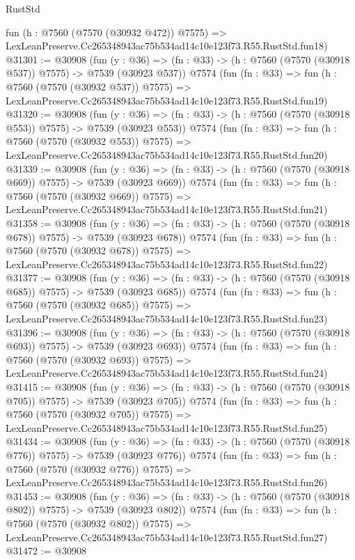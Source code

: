 \begin{lexlean}{RustStd}
\begin{coremodule}
    fun (h : @7560 (@7570 (@30932 @472)) @7575) =>
    LexLeanPreserve.Cc265348943ac75b534ad14c10e123f73.R55.RustStd.fun18)
@31301 := @30908
    (fun (y : @36) => (fn : @33) -> (h : @7560 (@7570 (@30918 @537)) @7575) -> @7539 (@30923 @537))
    @7574
    (fun (fn : @33) =>
    fun (h : @7560 (@7570 (@30932 @537)) @7575) =>
    LexLeanPreserve.Cc265348943ac75b534ad14c10e123f73.R55.RustStd.fun19)
@31320 := @30908
    (fun (y : @36) => (fn : @33) -> (h : @7560 (@7570 (@30918 @553)) @7575) -> @7539 (@30923 @553))
    @7574
    (fun (fn : @33) =>
    fun (h : @7560 (@7570 (@30932 @553)) @7575) =>
    LexLeanPreserve.Cc265348943ac75b534ad14c10e123f73.R55.RustStd.fun20)
@31339 := @30908
    (fun (y : @36) => (fn : @33) -> (h : @7560 (@7570 (@30918 @669)) @7575) -> @7539 (@30923 @669))
    @7574
    (fun (fn : @33) =>
    fun (h : @7560 (@7570 (@30932 @669)) @7575) =>
    LexLeanPreserve.Cc265348943ac75b534ad14c10e123f73.R55.RustStd.fun21)
@31358 := @30908
    (fun (y : @36) => (fn : @33) -> (h : @7560 (@7570 (@30918 @678)) @7575) -> @7539 (@30923 @678))
    @7574
    (fun (fn : @33) =>
    fun (h : @7560 (@7570 (@30932 @678)) @7575) =>
    LexLeanPreserve.Cc265348943ac75b534ad14c10e123f73.R55.RustStd.fun22)
@31377 := @30908
    (fun (y : @36) => (fn : @33) -> (h : @7560 (@7570 (@30918 @685)) @7575) -> @7539 (@30923 @685))
    @7574
    (fun (fn : @33) =>
    fun (h : @7560 (@7570 (@30932 @685)) @7575) =>
    LexLeanPreserve.Cc265348943ac75b534ad14c10e123f73.R55.RustStd.fun23)
@31396 := @30908
    (fun (y : @36) => (fn : @33) -> (h : @7560 (@7570 (@30918 @693)) @7575) -> @7539 (@30923 @693))
    @7574
    (fun (fn : @33) =>
    fun (h : @7560 (@7570 (@30932 @693)) @7575) =>
    LexLeanPreserve.Cc265348943ac75b534ad14c10e123f73.R55.RustStd.fun24)
@31415 := @30908
    (fun (y : @36) => (fn : @33) -> (h : @7560 (@7570 (@30918 @705)) @7575) -> @7539 (@30923 @705))
    @7574
    (fun (fn : @33) =>
    fun (h : @7560 (@7570 (@30932 @705)) @7575) =>
    LexLeanPreserve.Cc265348943ac75b534ad14c10e123f73.R55.RustStd.fun25)
@31434 := @30908
    (fun (y : @36) => (fn : @33) -> (h : @7560 (@7570 (@30918 @776)) @7575) -> @7539 (@30923 @776))
    @7574
    (fun (fn : @33) =>
    fun (h : @7560 (@7570 (@30932 @776)) @7575) =>
    LexLeanPreserve.Cc265348943ac75b534ad14c10e123f73.R55.RustStd.fun26)
@31453 := @30908
    (fun (y : @36) => (fn : @33) -> (h : @7560 (@7570 (@30918 @802)) @7575) -> @7539 (@30923 @802))
    @7574
    (fun (fn : @33) =>
    fun (h : @7560 (@7570 (@30932 @802)) @7575) =>
    LexLeanPreserve.Cc265348943ac75b534ad14c10e123f73.R55.RustStd.fun27)
@31472 := @30908

\end{coremodule}
\end{lexlean}
